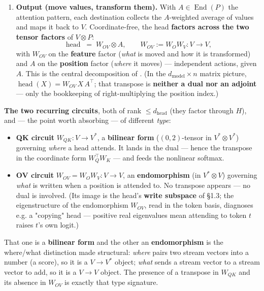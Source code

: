 \begin{enumerate}
\item \textbf{Output (move values, transform them).} With $A\in\operatorname{End}(P)$ the attention pattern, each destination collects the $A$-weighted average of values and maps it back to $V$. Coordinate-free, the head \textbf{factors across the two tensor factors} of $V\otimes P$: \[ \operatorname{head} \;=\; W_{OV} \otimes A, \qquad W_{OV} := W_O W_V : V \to V, \] with $W_{OV}$ on the \textbf{feature} factor (\emph{what} is moved and how it is transformed) and $A$ on the \textbf{position} factor (\emph{where} it moves) --- independent actions, given $A$. This is the central decomposition of \textcite{framework}. (In the $d_{\text{model}}\times n$ matrix picture, $\operatorname{head}(X)=W_{OV}\,X\,A^\top$; that transpose is \textbf{neither a dual nor an adjoint} --- only the bookkeeping of right-multiplying the position index.)
\end{enumerate}

\textbf{The two recurring circuits}, both of rank $\le d_{\text{head}}$ (they factor through $H$), and --- the point worth absorbing --- of different \emph{type}:

\begin{itemize}
\item \textbf{QK circuit} $W_{QK} : V \to V^{*}$, a \textbf{bilinear form} ($(0,2)$-tensor in $V^{*}\!\otimes V^{*}$) governing \emph{where} a head attends. It lands in the dual --- hence the transpose in the coordinate form $W_Q^{\top}W_K$ --- and feeds the nonlinear softmax.
\item \textbf{OV circuit} $W_{OV} = W_O W_V : V \to V$, an \textbf{endomorphism} (in $V^{*}\!\otimes V$) governing \emph{what} is written when a position is attended to. No transpose appears --- no dual is involved. (Its image is the head's \textbf{write subspace} of §1.3; the eigenstructure of the endomorphism $W_{OV}$, read in the token basis, diagnoses e.g. a "copying" head --- positive real eigenvalues mean attending to token $t$ raises $t$'s own logit.)
\end{itemize}

That one is a \textbf{bilinear form} and the other an \textbf{endomorphism} is the where/what distinction made structural: \emph{where} pairs two stream vectors into a number (a score), so it is a $V\to V^{*}$ object; \emph{what} sends a stream vector to a stream vector to add, so it is a $V\to V$ object. The presence of a transpose in $W_{QK}$ and its absence in $W_{OV}$ is exactly that type signature.


